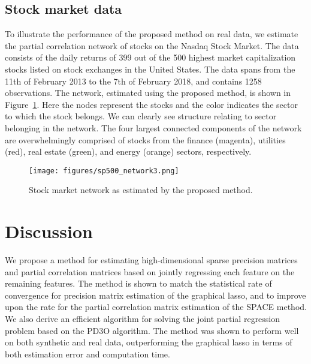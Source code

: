 \documentclass{article}
\begin{document}
                     

\subsection{Stock market data}\label{ssec:stock-market-data} 
To illustrate the performance of the proposed method on real data, we estimate
the partial correlation network of stocks on the Nasdaq Stock Market. The data
consists of the daily returns of 399 out of the 500 highest market
capitalization stocks listed on stock exchanges in the United States. The data
spans from the 11th of February 2013 to the 7th of February 2018, and contains
1258 observations. The network, estimated using the proposed method, is shown in
Figure~\ref{fig:asset-networks}. Here the nodes represent the stocks and the
color indicates the sector to which the stock belongs. We can clearly see
structure relating to sector belonging in the network. The four largest
connected components of the network are overwhelmingly comprised of stocks from
the finance (magenta), utilities (red), real estate (green), and energy (orange)
sectors, respectively.

\begin{figure}[ht]
    \centering
    \texttt{[image: figures/sp500\_network3.png]}
    \caption{Stock market network as estimated by the proposed method.}
    \label{fig:asset-networks}
\end{figure}


\section{Discussion}
We propose a method for estimating high-dimensional sparse precision matrices
and partial correlation matrices based on jointly regressing each feature on
the remaining features. The method is shown to match the statistical rate of
convergence for precision matrix estimation of the graphical lasso, and to
improve upon the rate for the partial correlation matrix estimation of the
SPACE method. We also derive an efficient algorithm for solving the joint
partial regression problem based on the PD3O algorithm. The method was shown to
perform well on both synthetic and real data, outperforming the graphical lasso
in terms of both estimation error and computation time. 
\end{document}
